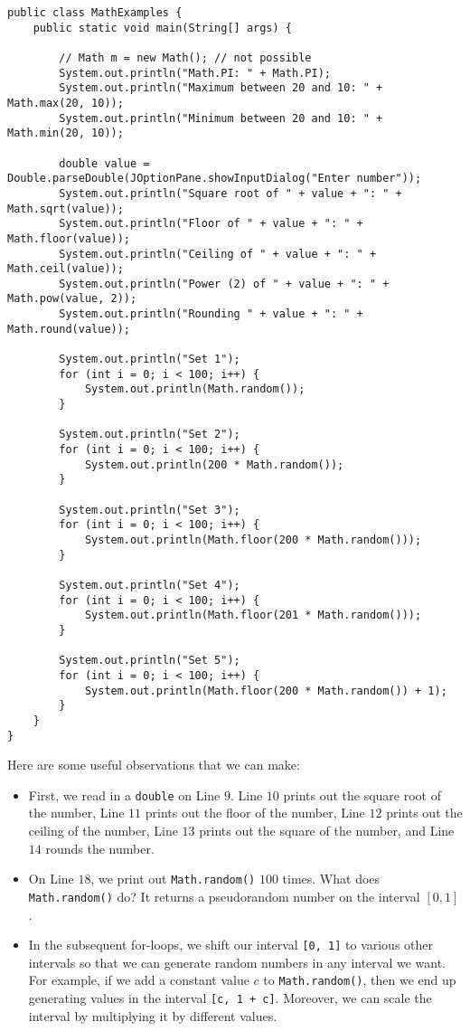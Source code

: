 \begin{lstlisting}
public class MathExamples {
	public static void main(String[] args) {

		// Math m = new Math(); // not possible
		System.out.println("Math.PI: " + Math.PI);
		System.out.println("Maximum between 20 and 10: " + Math.max(20, 10));
		System.out.println("Minimum between 20 and 10: " + Math.min(20, 10));

		double value = Double.parseDouble(JOptionPane.showInputDialog("Enter number"));
		System.out.println("Square root of " + value + ": " + Math.sqrt(value));
		System.out.println("Floor of " + value + ": " + Math.floor(value));
		System.out.println("Ceiling of " + value + ": " + Math.ceil(value));
		System.out.println("Power (2) of " + value + ": " + Math.pow(value, 2));
		System.out.println("Rounding " + value + ": " + Math.round(value));

		System.out.println("Set 1");
		for (int i = 0; i < 100; i++) {
			System.out.println(Math.random());
		}

		System.out.println("Set 2");
		for (int i = 0; i < 100; i++) {
			System.out.println(200 * Math.random());
		}

		System.out.println("Set 3");
		for (int i = 0; i < 100; i++) {
			System.out.println(Math.floor(200 * Math.random()));
		}

		System.out.println("Set 4");
		for (int i = 0; i < 100; i++) {
			System.out.println(Math.floor(201 * Math.random()));
		}

		System.out.println("Set 5");
		for (int i = 0; i < 100; i++) {
			System.out.println(Math.floor(200 * Math.random()) + 1);
		}
	}
}
\end{lstlisting}

Here are some useful observations that we can make:

\begin{itemize}
    \item First, we read in a \verb!double! on Line $9$. Line $10$ prints out the square root of the number, Line $11$ prints out the floor of the number, Line $12$ prints out the ceiling of the number, Line $13$ prints out the square of the number, and Line $14$ rounds the number.
    \item On Line $18$, we print out \verb!Math.random()! $100$ times. What does \verb!Math.random()! do? It returns a pseudorandom number on the interval $[0, 1]$. 
    \item In the subsequent for-loops, we shift our interval \verb![0, 1]! to various other intervals so that we can generate random numbers in any interval we want. For example, if we add a constant value $c$ to \verb!Math.random()!, then we end up generating values in the interval \verb![c, 1 + c]!. Moreover, we can scale the interval by multiplying it by different values.
\end{itemize}